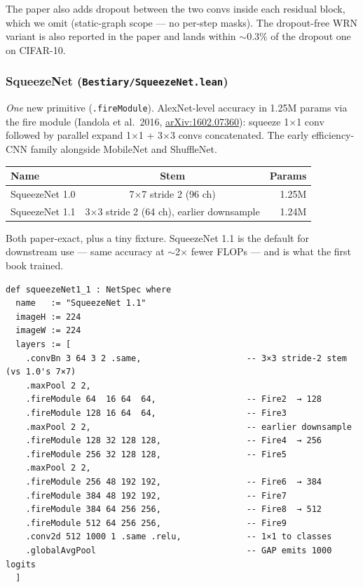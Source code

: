 The paper also adds dropout between the two convs inside each
residual block, which we omit (static-graph scope --- no per-step
masks). The dropout-free WRN variant is also reported in the
paper and lands within $\sim$0.3\% of the dropout one on CIFAR-10.

\subsubsection*{SqueezeNet (\texttt{Bestiary/SqueezeNet.lean})}
\emph{One} new primitive (\texttt{.fireModule}). AlexNet-level accuracy in 1.25M params
via the fire module (Iandola et al.\ 2016,
\href{https://arxiv.org/abs/1602.07360}{arXiv:1602.07360}): squeeze 1$\times$1 conv followed by parallel
expand 1$\times$1 + 3$\times$3 convs concatenated. The early
efficiency-CNN family alongside MobileNet and ShuffleNet.

\begin{center}
\begin{tabular}{l c r}
\hline
Name           & Stem               & Params \\
\hline
SqueezeNet 1.0 & 7$\times$7 stride 2 (96 ch) & 1.25M \\
SqueezeNet 1.1 & 3$\times$3 stride 2 (64 ch), earlier downsample & 1.24M \\
\hline
\end{tabular}
\end{center}

Both paper-exact, plus a tiny fixture. SqueezeNet 1.1 is the
default for downstream use --- same accuracy at $\sim$2$\times$
fewer FLOPs --- and is what the first book trained.

\begin{verbatim}
def squeezeNet1_1 : NetSpec where
  name   := "SqueezeNet 1.1"
  imageH := 224
  imageW := 224
  layers := [
    .convBn 3 64 3 2 .same,                     -- 3×3 stride-2 stem (vs 1.0's 7×7)
    .maxPool 2 2,
    .fireModule 64  16 64  64,                  -- Fire2  → 128
    .fireModule 128 16 64  64,                  -- Fire3
    .maxPool 2 2,                               -- earlier downsample
    .fireModule 128 32 128 128,                 -- Fire4  → 256
    .fireModule 256 32 128 128,                 -- Fire5
    .maxPool 2 2,
    .fireModule 256 48 192 192,                 -- Fire6  → 384
    .fireModule 384 48 192 192,                 -- Fire7
    .fireModule 384 64 256 256,                 -- Fire8  → 512
    .fireModule 512 64 256 256,                 -- Fire9
    .conv2d 512 1000 1 .same .relu,             -- 1×1 to classes
    .globalAvgPool                              -- GAP emits 1000 logits
  ]
\end{verbatim}

